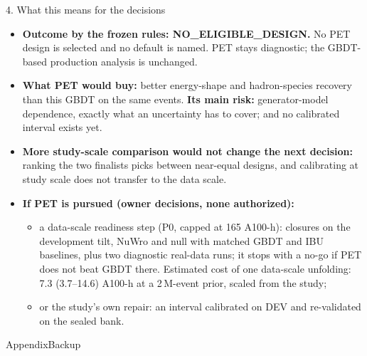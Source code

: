 \documentclass[aspectratio=169,10pt]{beamer}
\def\evidencetext{}
\begin{document}
\gdef\evidencetext{\texttt{results/final/coverage\_dev/decision\_final.json}; \texttt{../gbdt\_comparison/results/costs.json}; \texttt{../gbdt\_comparison/REPORT-20261005.md (6--8)}; \texttt{DECISION\_RECORD-pet-final-design.md}}
\begin{frame}{4. What this means for the decisions}
\small\begin{itemize}\item \textbf{Outcome by the frozen rules: NO\_ELIGIBLE\_DESIGN.} No PET design is selected and no default is named. PET stays diagnostic; the GBDT-based production analysis is unchanged.\item \textbf{What PET would buy:} better energy-shape and hadron-species recovery than this GBDT on the same events. \textbf{Its main risk:} generator-model dependence, exactly what an uncertainty has to cover; and no calibrated interval exists yet.\item \textbf{More study-scale comparison would not change the next decision:} ranking the two finalists picks between near-equal designs, and calibrating at study scale does not transfer to the data scale.\item \textbf{If PET is pursued (owner decisions, none authorized):}\begin{itemize}\item[--] a data-scale readiness step (P0, capped at 165 A100-h): closures on the development tilt, NuWro and null with matched GBDT and IBU baselines, plus two diagnostic real-data runs; it stops with a no-go if PET does not beat GBDT there. Estimated cost of one data-scale unfolding: 7.3 (3.7--14.6) A100-h at a 2\,M-event prior, scaled from the study;\item[--] or the study's own repair: an interval calibrated on DEV and re-validated on the sealed bank.\end{itemize}\end{itemize}
\end{frame}

\appendix
\gdef\evidencetext{}
\begin{frame}{Appendix}\centering\Large Backup\end{frame}
\end{document}
